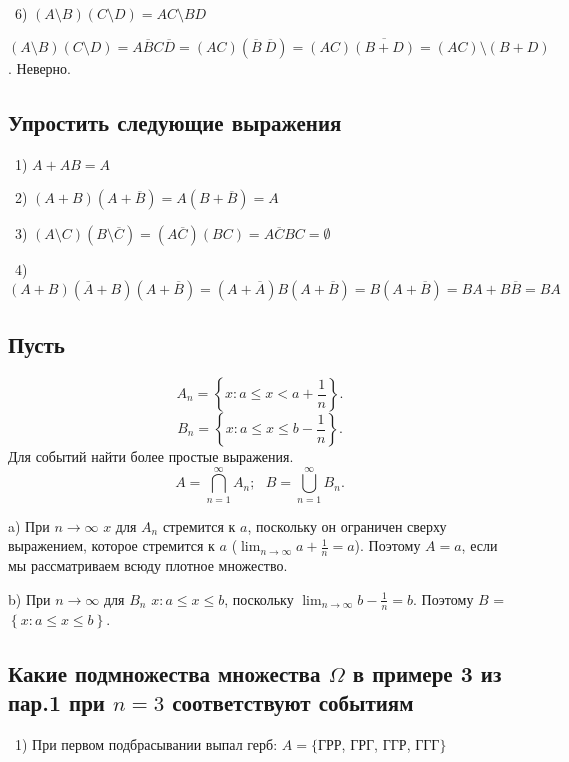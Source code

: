 \medskip
\noindent~6) $\left(A \setminus B\right)\left(C \setminus D\right) = AC \setminus BD$

\noindent $\left(A \setminus B\right) \left(C \setminus D\right) = A\overline{B}C\overline{D} =
\left(AC\right)\left(\overline{B}~\overline{D}\right) = \left(AC\right)\overline{\left(
B + D\right)} = \left(AC\right) \setminus \left(B + D\right)$. Неверно.
\subsection{Упростить следующие выражения}

\noindent~1) $A + AB = A$ 

\medskip
\noindent~2) $\left(A + B\right)\left(A + \overline{B}\right) = A \left(B + \overline{B}\right) = A$

\medskip
\noindent~3) $\left(A \setminus C\right)\left(B \setminus \overline{C}\right) = \left(A\overline{C}\right)
\left(BC\right) = A\overline{C}BC = \emptyset$

\medskip
\noindent~4) $\left(A + B\right)\left(\overline{A} + B\right)\left(A + \overline{B}\right) = 
\left(A + \overline{A}\right)B\left(A + \overline{B}\right) = B\left(A + \overline{B}\right) = 
BA + B\overline{B} = BA$

\subsection{Пусть}
\[
  A_n = \left\{x: a \le x < a + \frac{1}{n}\right\} 
.\] 
\[
  B_n = \left\{x: a \le x \le b - \frac{1}{n}\right\} 
.\] 
Для событий найти более простые выражения.
\[
  A = \bigcap_{n = 1}^{\infty} A_n;~~~ B = \bigcup_{n = 1}^\infty B_n
.\] 

\noindent a) При $n \to \infty$ $x$ для $A_n$ стремится к $a$, поскольку он ограничен сверху
выражением, которое стремится к $a$ ($\lim_{n \to \infty} a + \frac{1}{n} = a$). Поэтому $A = a$, если мы рассматриваем всюду плотное множество.

\medskip
\noindent b) При $n \to \infty$ для $B_n$ $x : a \le x \le b$, поскольку $\lim_{n \to \infty} b - \frac{1}{n} = b $.
Поэтому $B$ = $\left\{x: a \le x \le b\right\}$.


\subsection{Какие подмножества множества $\Omega$ в примере 3 из пар.1 при $n = 3$ соответствуют
событиям}

\noindent~1) При первом подбрасывании выпал герб: $A = \{$ГРР, ГРГ, ГГР, ГГГ$\}$

